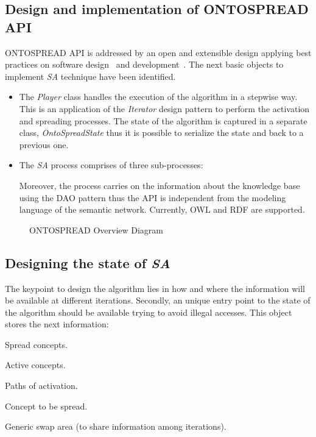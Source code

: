 \subsection{Design and implementation of ONTOSPREAD API}
ONTOSPREAD API is addressed by an open and extensible design applying
best practices on software design~\cite{Gamma,CoreJ2EEPatterns} and development~\cite{XP,Fowler1999}. 
The next basic objects to implement \textit{SA} technique have been identified.
\begin{itemize}

\item The \textit{Player} class handles the execution of the algorithm in a
      stepwise way. This is an application of the \textit{Iterator}
      design pattern to perform the activation and spreading processes. The state
      of the algorithm is captured in a separate class,
      \textit{OntoSpreadState} thus it is possible to serialize the
      state and back to a previous one.

\item The \textit{SA} process comprises of three sub-processes: 

Moreover, the process carries on the information about the knowledge base using the DAO
pattern thus the API is independent from the modeling language of the semantic network. Currently, OWL
and RDF are supported.
\end{itemize}

\begin{figure}[htb]
\centering
\caption{ONTOSPREAD Overview Diagram}
\label{fig:diagramas/general}
\end{figure}

\subsection{Designing the state of \textit{SA}}
The keypoint to design the algorithm lies in how and where
the information will be available at different iterations. Secondly, an unique entry point
to the state of the algorithm should be available trying to avoid
illegal accesses. This object stores the next information: \begin{inparaenum}\item Spread
concepts. \item Active concepts. \item Paths of activation. \item Concept to be
spread. \item Generic swap area (to share information among iterations). \end{inparaenum}

